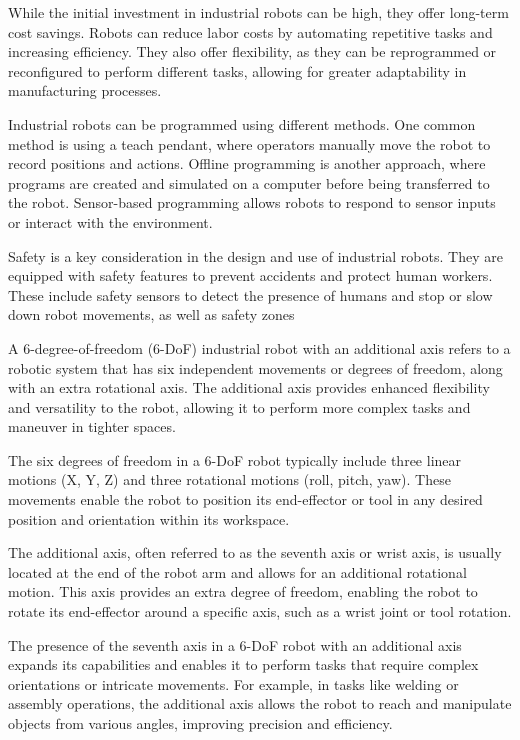 While the initial investment in industrial robots can be high, they offer long-term cost savings. Robots can reduce labor costs by automating repetitive tasks and increasing efficiency. They also offer flexibility, as they can be reprogrammed or reconfigured to perform different tasks, allowing for greater adaptability in manufacturing processes.

Industrial robots can be programmed using different methods. One common method is using a teach pendant, where operators manually move the robot to record positions and actions. Offline programming is another approach, where programs are created and simulated on a computer before being transferred to the robot. Sensor-based programming allows robots to respond to sensor inputs or interact with the environment.

Safety is a key consideration in the design and use of industrial robots. They are equipped with safety features to prevent accidents and protect human workers. These include safety sensors to detect the presence of humans and stop or slow down robot movements, as well as safety zones

A 6-degree-of-freedom (6-DoF) industrial robot with an additional axis refers to a robotic system that has six independent movements or degrees of freedom, along with an extra rotational axis. The additional axis provides enhanced flexibility and versatility to the robot, allowing it to perform more complex tasks and maneuver in tighter spaces.

The six degrees of freedom in a 6-DoF robot typically include three linear motions (X, Y, Z) and three rotational motions (roll, pitch, yaw). These movements enable the robot to position its end-effector or tool in any desired position and orientation within its workspace.

The additional axis, often referred to as the seventh axis or wrist axis, is usually located at the end of the robot arm and allows for an additional rotational motion. This axis provides an extra degree of freedom, enabling the robot to rotate its end-effector around a specific axis, such as a wrist joint or tool rotation.

The presence of the seventh axis in a 6-DoF robot with an additional axis expands its capabilities and enables it to perform tasks that require complex orientations or intricate movements. For example, in tasks like welding or assembly operations, the additional axis allows the robot to reach and manipulate objects from various angles, improving precision and efficiency.

